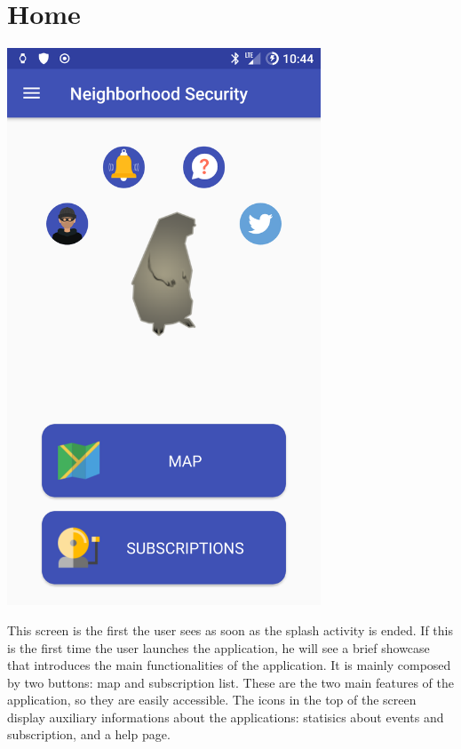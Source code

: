 \documentclass[a4paper]{scrreprt}
\begin{document}
\section{Home}
\begin{minipage}{0.5\textwidth}
	\centering
	\includegraphics[width=0.7\textwidth]{home}
\end{minipage}
\begin{minipage}{0.5\textwidth}
	This screen is the first the user sees as soon as the splash activity is ended. If this is the first time the user launches the application, he will see a brief showcase that introduces the main functionalities of the application. It is mainly composed by two buttons: map and subscription list. These are the two main features of the application, so they are easily accessible. The icons in the top of the screen display auxiliary informations about the applications: statisics about events and subscription, and a help page.
\end{minipage}
\end{document}

